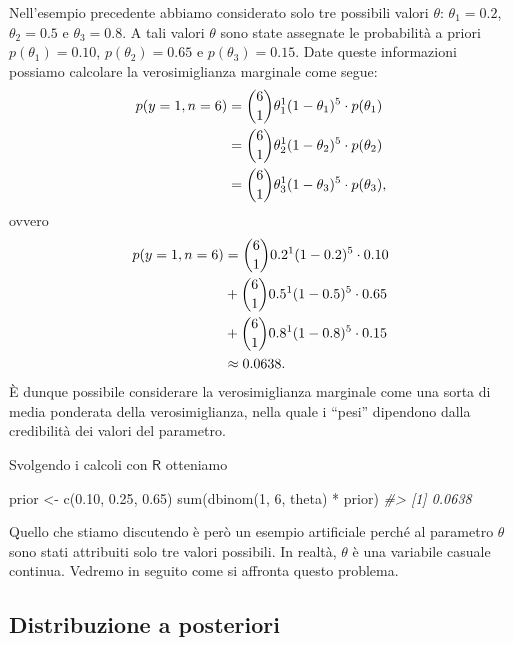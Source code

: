 \documentclass[
  10pt,
  italian,
  a4paper,
  extrafontsizes,onecolumn,openright
  ]{memoir}
\newenvironment{Shaded}{\begin{snugshade}}{\end{snugshade}}
\newcommand{\CommentTok}[1]{\textcolor[rgb]{0.56,0.35,0.01}{\textit{#1}}}
\newcommand{\DecValTok}[1]{\textcolor[rgb]{0.00,0.00,0.81}{#1}}
\newcommand{\FloatTok}[1]{\textcolor[rgb]{0.00,0.00,0.81}{#1}}
\newcommand{\FunctionTok}[1]{\textcolor[rgb]{0.00,0.00,0.00}{#1}}
\newcommand{\NormalTok}[1]{#1}
\newcommand{\OtherTok}[1]{\textcolor[rgb]{0.56,0.35,0.01}{#1}}
\newcommand{\SpecialCharTok}[1]{\textcolor[rgb]{0.00,0.00,0.00}{#1}}
\begin{document}
Nell'esempio precedente abbiamo considerato solo tre possibili valori \(\theta\): \(\theta_1 = 0.2\), \(\theta_2 = 0.5\) e \(\theta_3 = 0.8\). A tali valori \(\theta\) sono state assegnate le probabilità a priori \(p(\theta_1) = 0.10\), \(p(\theta_2) = 0.65\) e \(p(\theta_3) = 0.15\). Date queste informazioni possiamo calcolare la verosimiglianza marginale come segue:
\begin{align}
p(y = 1, n = 6) &= \binom{6}{1} \theta_1^{1} (1-\theta_1)^{5} \cdot p(\theta_1) \notag\\
&= \binom{6}{1} \theta_2^{1} (1-\theta_2)^{5} \cdot p(\theta_2) \notag\\
&= \binom{6}{1} \theta_3^{1} (1-\theta_3)^{5} \cdot p(\theta_3) \notag,
\end{align}
\noindent
ovvero
\begin{align}
p(y = 1, n = 6) &= \binom{6}{1} 0.2^{1} (1-0.2)^{5} \cdot 0.10 \notag\\
&+ \binom{6}{1} 0.5^{1} (1-0.5)^{5} \cdot 0.65 \notag\\
&+ \binom{6}{1} 0.8^{1} (1-0.8)^{5} \cdot 0.15 \notag\\
&\approx 0.0638.
\end{align}
È dunque possibile considerare la verosimiglianza marginale come una sorta di media ponderata della verosimiglianza, nella quale i ``pesi'' dipendono dalla credibilità dei valori del parametro.

Svolgendo i calcoli con \(\mathsf{R}\) otteniamo

\begin{Shaded}
\begin{Highlighting}[]
\NormalTok{prior }\OtherTok{\textless{}{-}} \FunctionTok{c}\NormalTok{(}\FloatTok{0.10}\NormalTok{, }\FloatTok{0.25}\NormalTok{, }\FloatTok{0.65}\NormalTok{)}
\FunctionTok{sum}\NormalTok{(}\FunctionTok{dbinom}\NormalTok{(}\DecValTok{1}\NormalTok{, }\DecValTok{6}\NormalTok{, theta) }\SpecialCharTok{*}\NormalTok{ prior)}
\CommentTok{\#\textgreater{} [1] 0.0638}
\end{Highlighting}
\end{Shaded}

Quello che stiamo discutendo è però un esempio artificiale perché al parametro \(\theta\) sono stati attribuiti solo tre valori possibili. In realtà, \(\theta\) è una variabile casuale continua. Vedremo in seguito come si affronta questo problema.

\hypertarget{distribuzione-a-posteriori}{%
\subsection{Distribuzione a posteriori}\label{distribuzione-a-posteriori}}
\end{document}
